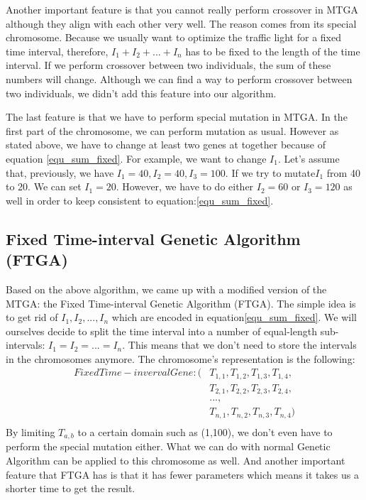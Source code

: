 \documentclass{article} %
\begin{document}
Another important feature is that you cannot really perform crossover in MTGA although they align with each other very well. The reason comes from its special chromosome. Because we usually want to optimize the traffic light for a fixed time interval, therefore, $I_1 + I_2 + ... + I_n$ has to be fixed to the length of the time interval. If we perform crossover between two individuals, the sum of these numbers will change. Although we can find a way to perform crossover between two individuals, we didn't add this feature into our algorithm.

The last feature is that we have to perform special mutation in MTGA. In the first part of the chromosome, we can perform mutation as usual. However as stated above, we have to change at least two genes at together because of equation \ref{equ_sum_fixed}. For example, we want to change ${I_1}$. Let's assume that, previously, we have $I_1 = 40, I_2 = 40, I_3 = 100$. If we try to mutate$I_1$ from 40 to 20. We can set $I_1 = 20$. However, we have to do either $I_2=60$ or $I_3=120$ as well in order to keep consistent to equation:\ref{equ_sum_fixed}. 


\subsection{Fixed Time-interval Genetic Algorithm (FTGA)}
Based on the above algorithm, we came up with a modified version of the MTGA: the Fixed Time-interval Genetic Algorithm (FTGA). The simple idea is to get rid of $I_1, I_2, ..., I_n$ which are encoded in equation\ref{equ_sum_fixed}. We will ourselves decide to split the time interval into a number of equal-length sub-intervals: $I_1=I_2=...=I_n$. This means that we don't need to store the intervals in the chromosomes anymore. The chromosome's representation is the following:
\begin{align}
Fixed Time-inverval Gene:
(&T_{1,1}, T_{1,2}, T_{1,3}, T_{1,4},\\
&T_{2,1}, T_{2,2}, T_{2,3}, T_{2,4},\\
&...,\\
&T_{n,1}, T_{n, 2}, T_{n,3}, T_{n, 4})\\
\end{align}
By limiting $T_{a,b}$ to a certain domain such as (1,100), we don't even have to perform the special mutation either. What we can do with normal Genetic Algorithm can be applied to this chromosome as well. And another important feature that FTGA has is that it has fewer parameters which means it takes us a shorter time to get the result. 
\end{document}
